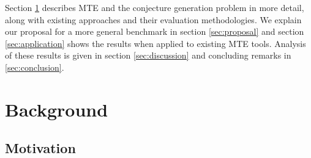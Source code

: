 Section \ref{sec:background} describes MTE and the conjecture generation problem
in more detail, along with existing approaches and their evaluation
methodologies. We explain our proposal for a more general benchmark in section
\ref{sec:proposal} and section \ref{sec:application} shows the results when
applied to existing MTE tools. Analysis of these results is given in section
\ref{sec:discussion} and concluding remarks in \ref{sec:conclusion}.



\section{Background}
\label{sec:background}

\subsection{Motivation}
\label{sec:motivation}


